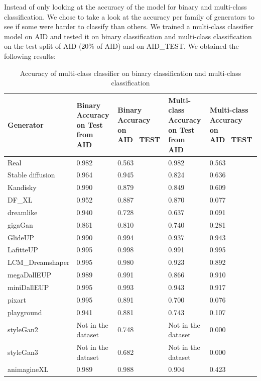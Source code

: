 \documentclass[12pt,a4paper]{article}
\begin{document}
Instead of only looking at the accuracy of the model for binary and multi-class classification. We chose to take a look at the accuracy per family of generators to see if some were harder to classify than others. We trained a multi-class classifier model on AID and tested it on binary classification and multi-class classification on the test split of AID (20\% of AID) and on AID\_TEST. We obtained the following results:
\begin{table}[H]
    \centering
        \begin{tabular}{|p{}|p{}|p{}|p{}|p{}|}
            \hline
            Generator & Binary Accuracy on Test from AID & Binary Accuracy on AID\_TEST & Multi-class Accuracy on Test from AID & Multi-class Accuracy on AID\_TEST\\
            \hline
            Real & 0.982 & 0.563 & 0.982 & 0.563\\
            \hline
            Stable diffusion & 0.964 & 0.945 & 0.824 & 0.636\\
            \hline
            Kandisky & 0.990 & 0.879 & 0.849 & 0.609\\
            \hline
            DF\_XL & 0.952 & 0.887 & 0.870 & 0.077\\
            \hline
            dreamlike & 0.940 & 0.728 & 0.637 & 0.091\\
            \hline
            gigaGan & 0.861 & 0.810 & 0.740 & 0.281\\
            \hline
            GlideUP & 0.990 & 0.994 & 0.937 & 0.943\\
            \hline
            LafitteUP & 0.995 & 0.998 & 0.991 & 0.995\\
            \hline
            LCM\_Dreamshaper & 0.995 & 0.980 & 0.923 & 0.892\\
            \hline
            megaDallEUP & 0.989 & 0.991 & 0.866 & 0.910\\
            \hline
            miniDallEUP & 0.995 & 0.993 & 0.943 & 0.917\\
            \hline
            pixart & 0.995 & 0.891 & 0.700 & 0.076\\
            \hline
            playground & 0.941 & 0.881 & 0.743 & 0.107\\
            \hline
            styleGan2 & Not in the dataset & 0.748 & Not in the dataset & 0.000\\
            \hline
            styleGan3 & Not in the dataset & 0.682 & Not in the dataset & 0.000\\
            \hline
            animagineXL & 0.989 & 0.988 & 0.904 & 0.423\\
            \hline
        \end{tabular}
        \caption{Accuracy of multi-class classifier on binary classification and multi-class classification}
    \end{table}
\end{document}
